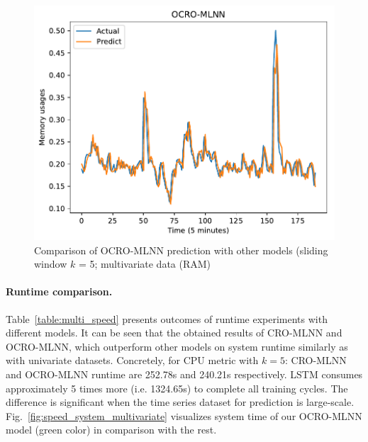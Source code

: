 \documentclass[smallcondensed, natbib]{svjour3}     %
\begin{document}
{\begin{figure}[!ht]
\begin{minipage}[b]{0.33\linewidth}
    \includegraphics[width=0.9\linewidth]{images/pdf/predict/k5/ram_k5_ocro_mlnn.pdf} 
  \end{minipage} 
  
  \caption{Comparison of OCRO-MLNN prediction with other models (sliding window $k$ = 5; multivariate data (RAM)} 
  \label{predict_ram_sliding5} 
\end{figure}

\paragraph{\textbf{Runtime comparison.}} Table~\ref{table:multi_speed} presents outcomes of runtime experiments with different models. It can be seen that the obtained results of CRO-MLNN and OCRO-MLNN, which outperform other models on system runtime similarly as with univariate datasets. Concretely, for CPU metric with $k = 5$: CRO-MLNN and OCRO-MLNN runtime are 252.78s and 240.21s respectively. LSTM consumes approximately 5 times more (i.e. 1324.65s) to complete all training cycles. The difference is significant when the time series dataset for prediction is large-scale. Fig.~\ref{fig:speed_system_multivariate} visualizes system time of our OCRO-MLNN model (green color) in comparison with the rest.


}
\end{document}
